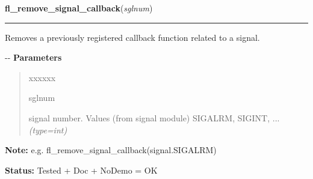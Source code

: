     \label{xformslib:flbasic:fl_remove_signal_callback}

    \vspace{0.5ex}

\hspace{.8\funcindent}\begin{boxedminipage}{\funcwidth}

    \raggedright \textbf{fl\_remove\_signal\_callback}(\textit{sglnum})

    \vspace{-1.5ex}

    \rule{\textwidth}{0.5\fboxrule}
\setlength{\parskip}{2ex}

Removes a previously registered callback function related to a signal.

-{}-
\setlength{\parskip}{1ex}
      \textbf{Parameters}
      \vspace{-1ex}

      \begin{quote}
        \begin{Ventry}{xxxxxx}

          \item[sglnum]


signal number. Values (from signal module) SIGALRM, SIGINT, ...
            {\it (type=int)}

        \end{Ventry}

      \end{quote}

\textbf{Note:} 
e.g. fl\_remove\_signal\_callback(signal.SIGALRM)


\textbf{Status:} 
Tested + Doc + NoDemo = OK


    \end{boxedminipage}

    \label{xformslib:flbasic:fl_signal_caught}

    \vspace{0.5ex}

